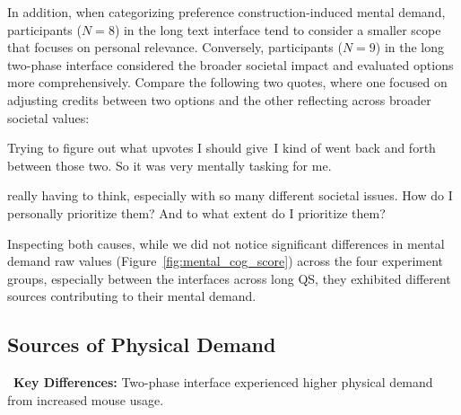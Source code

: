In addition, when categorizing preference construction-induced mental demand, participants ($N=8$) in the long text interface tend to consider a smaller scope that focuses on personal relevance. Conversely, participants ($N=9$) in the long two-phase interface considered the broader societal impact and evaluated options more comprehensively. Compare the following two quotes, where one focused on adjusting credits between two options and the other reflecting across broader societal values:

\begin{displayquote}
Trying to figure out what upvotes I should give~\bracketellipsis I kind of went back and forth between those two. \bracketellipsis So it was very mentally tasking for me. \hfill{}
\end{displayquote}

\begin{displayquote}
\bracketellipsis really having to think, especially with so many different societal issues. How do I personally prioritize them? And to what extent do I prioritize them? \hfill{}
\end{displayquote}

Inspecting both causes, while we did not notice significant differences in mental demand raw values (Figure~\ref{fig:mental_cog_score}) across the four experiment groups, especially between the interfaces across long QS, they exhibited different sources contributing to their mental demand.



\subsection{Sources of Physical Demand} 
\label{sec:physical}

\begin{tldrbox}
   \faKey~\textbf{Key Differences:} Two-phase interface experienced higher physical demand from increased mouse usage.
\end{tldrbox}

